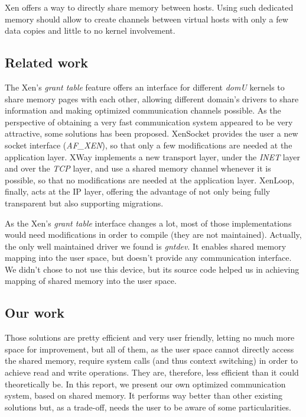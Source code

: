 \documentclass[journal]{IEEEtran}
\begin{document}


Xen offers a way to directly share memory between hosts.
Using such dedicated memory should allow to create channels between virtual hosts with only a few data copies and little to no kernel involvement.

\subsection{Related work}

The Xen's \emph{grant table} feature offers an interface for different \emph{domU} kernels to share memory pages with each other, allowing different domain's drivers to share information and making optimized communication channels possible. As the perspective of obtaining a very fast communication system appeared to be very attractive, some solutions has been proposed. XenSocket\cite{XenSocket} provides the user a new socket interface (\emph{AF\_XEN}), so that only a few modifications are needed at the application layer. XWay\cite{XWay} implements a new transport layer, under the \emph{INET} layer and over the \emph{TCP} layer, and use a shared memory channel whenever it is possible, so that no modifications are needed at the application layer. XenLoop\cite{XenLoop}, finally, acts at the IP layer, offering the advantage of not only being fully transparent but also supporting migrations. 

As the Xen's \emph{grant table} interface changes a lot, most of those implementations would need modifications in order to compile (they are not maintained). Actually, the only well maintained driver we found is \emph{gntdev}. It enables shared memory mapping into the user space, but doesn't provide any communication interface. 
We didn't chose to not use this device, but its source code helped us in achieving mapping of shared memory into the user space. 

\subsection{Our work}

Those solutions are pretty efficient and very user friendly, letting no much more space for improvement, but all of them, as the user space cannot directly access the shared memory, require system calls (and thus context switching) in order to achieve read and write operations.
They are, therefore, less efficient than it could theoretically be. 
In this report, we present our own optimized communication system, based on shared memory. It performs way better than other existing solutions but, as a trade-off, needs the user to be aware of some particularities.
\end{document}
